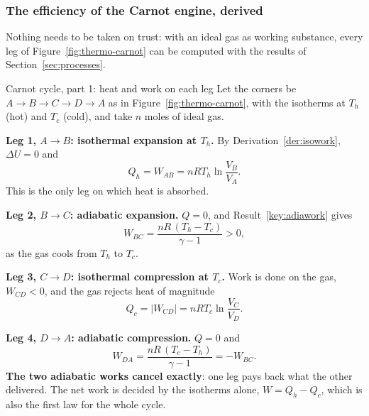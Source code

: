
\subsubsection{The efficiency of the Carnot engine, derived}

Nothing needs to be taken on trust: with an ideal gas as working substance, every leg of
Figure~\ref{fig:thermo-carnot} can be computed with the results of Section~\ref{sec:processes}.

\begin{derivbox}{Carnot cycle, part 1: heat and work on each leg}\label{der:carnot1}
Let the corners be $A\to B\to C\to D\to A$ as in Figure~\ref{fig:thermo-carnot}, with the isotherms at
$T_h$ (hot) and $T_c$ (cold), and take $n$ moles of ideal gas.

 \textbf{Leg 1, $A\to B$: isothermal expansion at $T_h$.} By Derivation~\ref{der:isowork}, $\Delta U=0$
and
\[
Q_h=W_{AB}=nRT_h\ln\frac{V_B}{V_A}.
\]
This is the only leg on which heat is absorbed.

 \textbf{Leg 2, $B\to C$: adiabatic expansion.} $Q=0$, and Result~\ref{key:adiawork} gives
\[
W_{BC}=\frac{nR\,(T_h-T_c)}{\gamma-1}>0,
\]
as the gas cools from $T_h$ to $T_c$.

 \textbf{Leg 3, $C\to D$: isothermal compression at $T_c$.} Work is done on the gas, $W_{CD}<0$, and
the gas rejects heat of magnitude
\[
Q_c=|W_{CD}|=nRT_c\ln\frac{V_C}{V_D}.
\]

 \textbf{Leg 4, $D\to A$: adiabatic compression.} $Q=0$ and
\[
W_{DA}=\frac{nR\,(T_c-T_h)}{\gamma-1}=-W_{BC}.
\]
\textbf{The two adiabatic works cancel exactly}: one leg pays back what the other delivered. The net work
is decided by the isotherms alone, $W=Q_h-Q_c$, which is also the first law for the whole cycle.
\end{derivbox}

